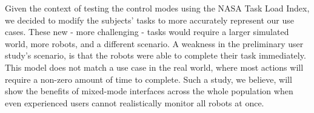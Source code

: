 Given the context of testing the control modes using the NASA Task Load Index, we decided to modify the subjects' tasks to more accurately represent our use cases. These new - more challenging - tasks would require a larger simulated world, more robots, and a different scenario. A weakness in the preliminary user study's scenario, is that the robots were able to complete their task immediately. This model does not match a use case in the real world, where most actions will require a non-zero amount of time to complete. Such a study, we believe, will show the benefits of mixed-mode interfaces across the whole population when even experienced users cannot realistically monitor all robots at once.

